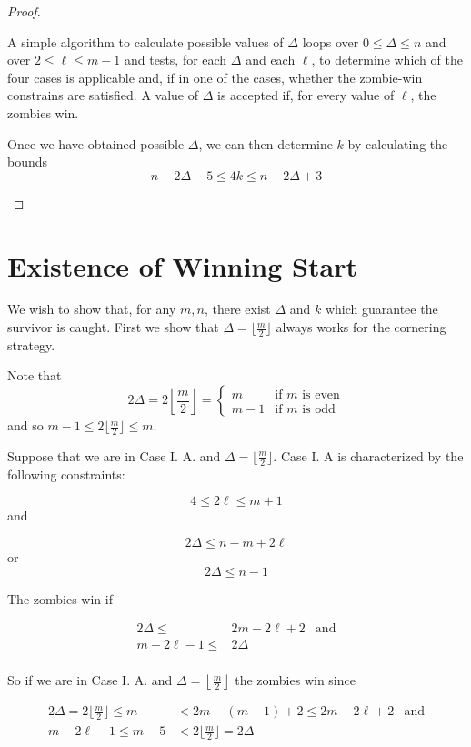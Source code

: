 \begin{proof}
\begin{proofpart}
A simple algorithm to calculate possible values of $\Delta$ loops
over $0 \leq \Delta \leq n$ and over $2 \leq \ell \leq m-1$ and tests,
for each $\Delta$ and each $\ell$, to determine which of the four cases is
applicable and, if in one of the cases, whether the zombie-win constrains are
satisfied. A value of $\Delta$ is accepted if, for every value of $\ell$, the
zombies win.

Once we have obtained possible $\Delta$, we can then determine $k$ by
calculating the bounds
\[ n - 2\Delta -5 \leq 4k \leq n-2\Delta +3 \]


 \end{proofpart}
\end{proof}

\newpage
\section{Existence of Winning Start}

We wish to show that, for any $m, n$, there exist $\Delta$ and $k$
which guarantee the survivor is caught.
First we show that $\Delta = \lfloor \frac{m}{2} \rfloor$ always
works for the cornering strategy.

Note that
\[
2\Delta = 2 \left\lfloor \frac{m}{2} \right\rfloor =
\begin{cases}
m & \text{if $m$ is even} \\
m -1 & \text{if $m$ is odd}
\end{cases}
\]
and so $m -1 \leq 2 \lfloor \frac{m}{2} \rfloor \leq m$.

Suppose that we are in Case I. A. and $\Delta = \lfloor \frac{m}{2} \rfloor$.
Case I. A is characterized by the following constraints:

\[ 4 \leq 2 \ell \leq m+1 \]
and

\[ 2\Delta \leq n - m + 2\ell \]
or
\[ 2\Delta \leq n-1 \]

The zombies win if

\begin{align*}
 2 \Delta \leq      & 2 m- 2 \ell + 2 & \text{and} \\
 m - 2\ell  -1 \leq & 2 \Delta                     \\
\end{align*}

So if we are in Case I. A. and $\Delta = \left\lfloor \frac{m}{2} \right\rfloor$ the zombies win since

\begin{align*}
  2 \Delta = 2 \lfloor \frac{m}{2} \rfloor \leq m &< 2m - (m+1) + 2\leq 2 m- 2 \ell + 2 & \text{and}\\
  m - 2\ell -1 \leq m - 5 &< 2 \lfloor \frac{m}{2} \rfloor = 2 \Delta
\end{align*}

